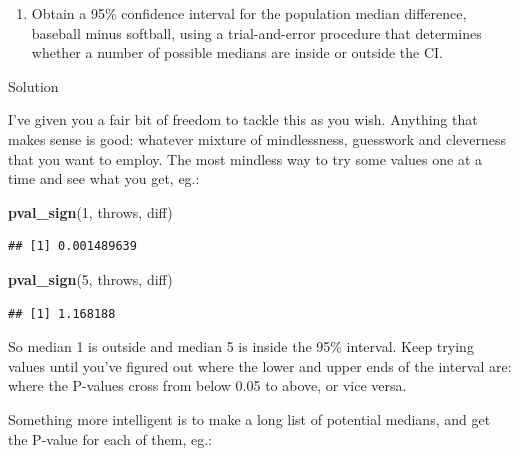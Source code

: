 \documentclass[]{tufte-book}
\newenvironment{Shaded}{}{}
\newcommand{\DataTypeTok}[1]{\textcolor[rgb]{0.56,0.13,0.00}{#1}}
\newcommand{\DecValTok}[1]{\textcolor[rgb]{0.25,0.63,0.44}{#1}}
\newcommand{\KeywordTok}[1]{\textcolor[rgb]{0.00,0.44,0.13}{\textbf{#1}}}
\newcommand{\NormalTok}[1]{#1}
\newcommand{\OperatorTok}[1]{\textcolor[rgb]{0.40,0.40,0.40}{#1}}
\newcommand{\StringTok}[1]{\textcolor[rgb]{0.25,0.44,0.63}{#1}}
\providecommand{\tightlist}{%
  \setlength{\itemsep}{0pt}\setlength{\parskip}{0pt}}
\theoremstyle{definition}
\theoremstyle{definition}
\theoremstyle{definition}
\theoremstyle{remark}
\begin{document}
\begin{enumerate}
\def\labelenumi{(\alph{enumi})}
\setcounter{enumi}{4}
\tightlist
\item
  Obtain a 95\% confidence interval for the population median
  difference, baseball minus softball, using a trial-and-error procedure
  that determines whether a number of possible medians are inside or
  outside the CI.
\end{enumerate}

Solution

I've given you a fair bit of freedom to tackle this as you wish.
Anything that makes sense is good: whatever mixture of mindlessness,
guesswork and cleverness that you want to employ. The most mindless way
to try some values one at a time and see what you get, eg.:

\begin{Shaded}
\begin{Highlighting}[]
\KeywordTok{pval_sign}\NormalTok{(}\DecValTok{1}\NormalTok{, throws, diff)}
\end{Highlighting}
\end{Shaded}

\begin{verbatim}
## [1] 0.001489639
\end{verbatim}

\begin{Shaded}
\begin{Highlighting}[]
\KeywordTok{pval_sign}\NormalTok{(}\DecValTok{5}\NormalTok{, throws, diff)}
\end{Highlighting}
\end{Shaded}

\begin{verbatim}
## [1] 1.168188
\end{verbatim}

So median 1 is outside and median 5 is inside the 95\% interval. Keep
trying values until you've figured out where the lower and upper ends of
the interval are: where the P-values cross from below 0.05 to above, or
vice versa.

Something more intelligent is to make a long list of potential medians,
and get the P-value for each of them, eg.:

\begin{Shaded}
\end{Shaded}
\end{document}

